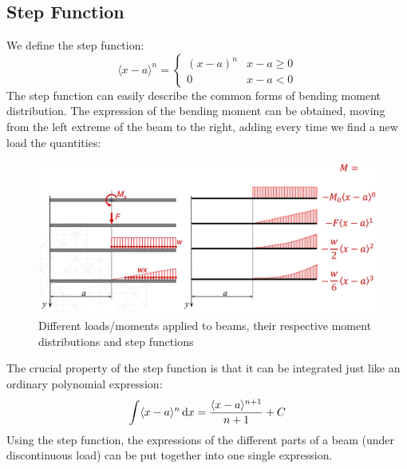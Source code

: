 \documentclass[class=report, crop=false, 12pt,a4paper]{standalone}
\begin{document}
\subsection{Step Function}
We define the step function:
\[ 
  \langle x-a \rangle^n =   
  \begin{cases} 
    (x-a)^n & x-a\geq 0 \\
    0 & x-a<0 
  \end{cases}
\]
The step function can easily describe the common forms of bending moment distribution. The expression of the bending moment can be obtained, moving from the left extreme of the beam to the right, adding every time we find a new load the quantities:
\begin{figure}[H]
  \centering
  \includegraphics[width = 1 \textwidth]{../img/beam7.PNG}
  \caption{Different loads/moments applied to beams, their respective moment distributions and step functions}
\end{figure}
The crucial property of the step function is that it can be integrated just like an ordinary polynomial expression: 
\begin{gather}
  \int \langle x-a \rangle^n \dif x = \frac{\langle x-a \rangle^{n+1}}{n+1} + C
\end{gather}
Using the step function, the expressions of the different parts of a beam (under discontinuous load) can be put together into one single expression.
\end{document}
